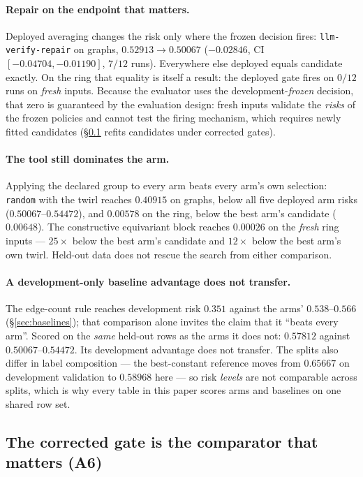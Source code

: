\documentclass{neurips_2024}
\begin{document}
\paragraph{Repair on the endpoint that matters.} Deployed averaging changes the risk only
where the frozen decision fires: \texttt{llm-verify-repair} on graphs, $0.52913 \to 0.50067$
($-0.02846$, CI $[-0.04704, -0.01190]$, $7/12$ runs). Everywhere else deployed equals
candidate exactly. On the ring that equality is itself a result: the deployed gate fires on
$0/12$ runs on \emph{fresh} inputs. Because the evaluator uses the development-\emph{frozen}
decision, that zero is guaranteed by the evaluation design: fresh inputs validate the
\emph{risks} of the frozen policies and cannot test the firing mechanism, which requires
newly fitted candidates (\S\ref{sec:corrected} refits candidates under corrected gates).

\paragraph{The tool still dominates the arm.} Applying the declared group to every arm beats
every arm's own selection: \texttt{random} with the twirl reaches $0.40915$ on graphs, below
all five deployed arm risks ($0.50067$--$0.54472$), and $0.00578$ on the ring, below the best
arm's candidate ($0.00648$). The constructive equivariant block reaches $0.00026$ on the
\emph{fresh} ring inputs --- $25\times$ below the best arm's candidate and $12\times$ below the
best arm's own twirl. Held-out data does not rescue the search from either comparison.

\paragraph{A development-only baseline advantage does not transfer.} The edge-count rule
reaches development risk $0.351$ against the arms' $0.538$--$0.566$
(\S\ref{sec:baselines}); that comparison alone invites the claim that it ``beats every arm''.
Scored on the \emph{same} held-out rows as the arms it does not: $0.57812$ against
$0.50067$--$0.54472$. Its development advantage does not transfer. The splits also differ in
label composition --- the best-constant reference moves from $0.65667$ on development
validation to $0.58968$ here --- so risk \emph{levels} are not comparable across splits, which
is why every table in this paper scores arms and baselines on one shared row set.

\subsection{The corrected gate is the comparator that matters (A6)}
\label{sec:corrected}
\end{document}

